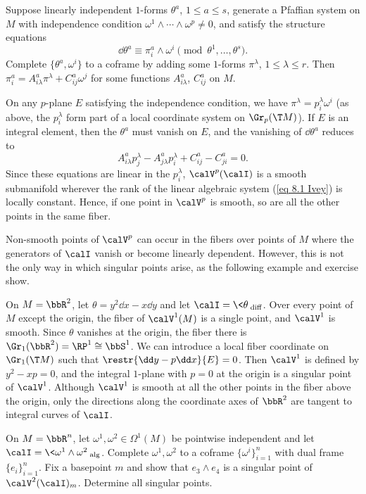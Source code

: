 \begin{example}
    Suppose linearly independent $1$-forms $\theta^a$, $1\leq a\leq s$, generate a Pfaffian system on $M$ with independence condition $\omega^1\wedge\cdots\wedge\omega^p\neq 0$, and satisfy the structure equations 
    \[\dd\theta^a\equiv \pi^a_i\wedge\omega^i\pmod{\theta^1,\ldots,\theta^s}.\]
    Complete $\{\theta^a,\omega^i\}$ to a coframe by adding some $1$-forms $\pi^\lambda$, $1\leq\lambda\leq r$. Then $\pi^a_i=A^a_{i\lambda}\pi^\lambda+C^a_{ij}\omega^j$ for some functions $A^a_{i\lambda}$, $C^a_{ij}$ on $M$.

    On any $p$-plane $E$ satisfying the independence condition, we have $\pi^\lambda=p^\lambda_i\omega^i$ (as above, the $p^\lambda_i$ form part of a local coordinate system on $\Gr_p(\T M)$). If $E$ is an integral element, then the $\theta^a$ must vanish on $E$, and the vanishing of $\dd\theta^a$ reduces to
    \[A^a_{i\lambda}p^\lambda_j-A^a_{j\lambda}p^\lambda_i+C^a_{ij}-C^a_{ji}=0.\label{eq 8.1 Ivey}\]
    Since these equations are linear in the $p^\lambda_i$, $\calV^p(\calI)$ is a smooth submanifold wherever the rank of the linear algebraic system (\ref{eq 8.1 Ivey}) is locally constant. Hence, if one point in $\calV^p$ is smooth, so are all the other points in the same fiber.
\end{example}


Non-smooth points of $\calV^p$ can occur in the fibers over points of $M$ where the generators of $\calI$ vanish or become linearly dependent. However, this is not the only way in which singular points arise, as the following example and exercise show.

\begin{example}
    On $M=\bbR^2$, let $\theta=y^2\dd x-x\dd y$ and let $\calI=\<\theta\>_{\mathrm{diff}}$. Over every point of $M$ except the origin, the fiber of $\calV^1(M)$ is a single point, and $\calV^1$ is smooth. Since $\theta$ vanishes at the origin, the fiber there is $\Gr_1(\bbR^2)=\RP^1\cong \bbS^1$. We can introduce a local fiber coordinate on $\Gr_1(\T M)$ such that $\restr{\dd y-p\dd x}{E}=0$. Then $\calV^1$ is defined by $y^2-xp=0$, and the integral $1$-plane with $p=0$ at the origin is a singular point of $\calV^1$. Although $\calV^1$ is smooth at all the other points in the fiber above the origin, only the directions along the coordinate axes of $\bbR^2$ are tangent to integral curves of $\calI$.
\end{example}

\begin{xca}
    On $M=\bbR^n$, let $\omega^1,\omega^2\in\Omega^1(M)$ be pointwise independent and let $\calI=\<\omega^1\wedge\omega^2\>_{\mathrm{alg}}$. Complete $\omega^1,\omega^2$ to a coframe $\{\omega^i\}_{i=1}^n$ with dual frame $\{e_i\}_{i=1}^n$. Fix a basepoint $m$ and show that $e_3\wedge e_4$ is a singular point of $\calV^2(\calI)_m$. Determine all singular points.
\end{xca}

